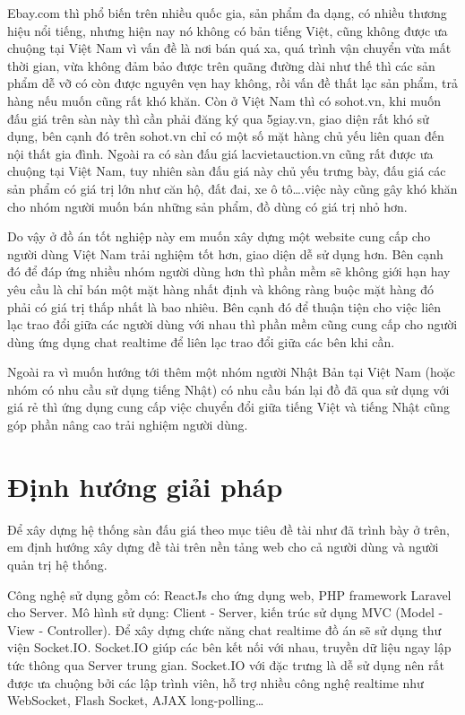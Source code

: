 \documentclass[../DoAn.tex]{subfiles}
\begin{document}
Ebay.com thì phổ biến trên nhiều quốc gia, sản phẩm đa dạng, có nhiều thương hiệu nổi tiếng, nhưng hiện nay nó không có bản tiếng Việt, cũng không được ưa chuộng tại Việt Nam vì vấn đề là nơi bán quá xa, quá trình vận chuyển vừa mất thời gian, vừa không đảm bảo được trên quãng đường dài như thế thì các sản phẩm dễ vỡ có còn được nguyên vẹn hay không, rồi vấn đề thất lạc sản phẩm, trả hàng nếu muốn cũng rất khó khăn. Còn ở Việt Nam thì có sohot.vn, khi muốn đấu giá trên sàn này thì cần phải đăng ký qua 5giay.vn, giao diện rất khó sử dụng, bên cạnh đó trên sohot.vn chỉ có một số mặt hàng chủ yếu liên quan đến nội thất gia đình. Ngoài ra có sàn đấu giá lacvietauction.vn cũng rất được ưa chuộng tại Việt Nam, tuy nhiên sàn đấu giá này chủ yếu trưng bày, đấu giá  các sản phẩm có giá trị lớn như căn hộ, đất đai, xe ô tô….việc này cũng gây khó khăn cho nhóm người muốn bán những sản phẩm, đồ dùng có giá trị nhỏ hơn.

Do vậy ở đồ án tốt nghiệp này em muốn xây dựng một website cung cấp cho người dùng Việt Nam trải nghiệm tốt hơn, giao diện dễ sử dụng hơn. Bên cạnh đó để đáp ứng nhiều nhóm người dùng hơn thì phần mềm sẽ không giới hạn hay yêu cầu là chỉ bán một mặt hàng nhất định và không ràng buộc mặt hàng đó phải có giá trị thấp nhất là bao nhiêu. Bên cạnh đó để thuận tiện cho việc liên lạc trao đổi giữa các người dùng với nhau thì phần mềm cũng cung cấp cho người dùng ứng dụng chat realtime để liên lạc trao đổi giữa các bên khi cần. 

Ngoài ra vì muốn hướng tới thêm một nhóm người Nhật Bản tại Việt Nam (hoặc nhóm có nhu cầu sử dụng tiếng Nhật) có nhu cầu bán lại đồ đã qua sử dụng với giá rẻ thì ứng dụng cung cấp việc chuyển đổi giữa tiếng Việt và tiếng Nhật cũng góp phần nâng cao trải nghiệm người dùng.

\section{Định hướng giải pháp}
\label{section:1.3}
Để xây dựng hệ thống sàn đấu giá theo mục tiêu đề tài như đã trình bày ở trên, em định hướng xây dựng đề tài trên nền tảng web cho cả người dùng và người quản trị hệ thống. 

Công nghệ sử dụng gồm có: ReactJs cho ứng dụng web, PHP framework Laravel cho Server. Mô hình sử dụng: Client - Server, kiến trúc sử dụng MVC (Model - View - Controller). Để xây dựng chức năng chat realtime đồ án sẽ sử dụng thư viện Socket.IO. Socket.IO giúp các bên kết nối với nhau, truyền dữ liệu ngay lập tức thông qua Server trung gian. Socket.IO với đặc trưng là dễ sử dụng nên rất được ưa chuộng bởi các lập trình viên, hỗ trợ  nhiều công nghệ realtime như WebSocket, Flash Socket, AJAX long-polling…
\end{document}
